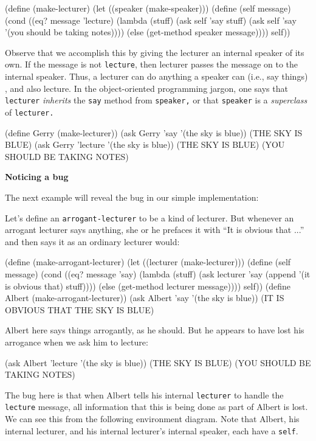 \beginlisp
(define (make-lecturer)
  (let ((speaker (make-speaker)))
    (define (self message)
      (cond ((eq? message 'lecture)
             (lambda (stuff)
               (ask self 'say stuff)
               (ask self 'say '(you should be taking notes))))
            (else (get-method speaker message))))
    self))
\endlisp

Observe that we accomplish this by giving the lecturer an internal
speaker of its own. If the message is not {\tt lecture}, then lecturer
passes the message on
to the internal speaker.  Thus, a lecturer can do anything a speaker can
(i.e., say things) , and also lecture.  In the object-oriented
programming jargon, one says that {\tt  lecturer}  {\it inherits} the
{\tt say}  method from {\tt speaker,} or that {\tt speaker} is a {\it
superclass}  of {\tt  lecturer.}

\beginlisp
(define Gerry (make-lecturer))
(ask Gerry 'say '(the sky is blue))
(THE SKY IS BLUE)
\null
(ask Gerry 'lecture '(the sky is blue))
(THE SKY IS BLUE)
(YOU SHOULD BE TAKING NOTES)
\endlisp


{\bf Noticing a bug}

The next example will reveal the bug in our simple implementation:

Let's define an {\tt arrogant-lecturer} to be a kind of lecturer.  But
whenever an arrogant lecturer says anything, she or he prefaces it
with ``It is obvious that ...''  and then says it as an ordinary
lecturer would:

\beginlisp
(define (make-arrogant-lecturer)
  (let ((lecturer (make-lecturer)))
    (define (self message)
      (cond ((eq? message 'say)
             (lambda (stuff)
               (ask lecturer 'say (append '(it is obvious that) stuff))))
            (else (get-method lecturer message))))
    self))
\null
(define Albert (make-arrogant-lecturer))
\null
(ask Albert 'say '(the sky is blue))
(IT IS OBVIOUS THAT THE SKY IS BLUE)
\endlisp

Albert here says things arrogantly, as he should.  But he appears to have
lost his arrogance when we ask him to lecture:

\beginlisp
(ask Albert 'lecture '(the sky is blue))
(THE SKY IS BLUE)
(YOU SHOULD BE TAKING NOTES)
\endlisp

The bug here is that when Albert tells his internal {\tt lecturer} to handle the
{\tt lecture}  message, all information that this is being done as part of Albert
is lost.  We can see this from the following environment diagram.  Note
that Albert, his internal lecturer, and his internal lecturer's internal
speaker, each have a {\tt self}.

